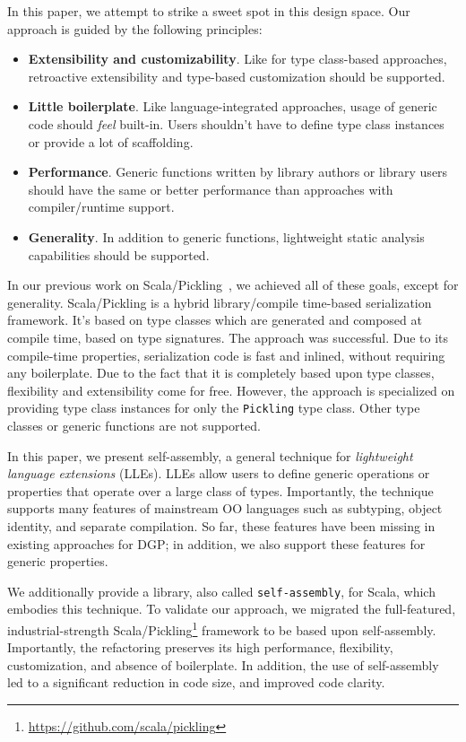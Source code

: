 \documentclass[preprint,nocopyrightspace]{sigplanconf}
\newcommand{\sselfassembly}{\texttt{self-assembly}}
\begin{document}
In this paper, we attempt to strike a sweet spot in this design space. Our
approach is guided by the following principles:

\begin{itemize}
\item\textbf{Extensibility and customizability}. Like for type class-based
     approaches, retroactive extensibility and type-based customization
     should be supported.

\item\textbf{Little boilerplate}. Like language-integrated approaches, usage
     of generic code should \emph{feel} built-in. Users shouldn't have to define
     type class instances or provide a lot of scaffolding.

\item\textbf{Performance}. Generic functions written by library authors or library
     users should have the same or better performance than approaches with
     compiler/runtime support.

\item\textbf{Generality}. In addition to generic functions, lightweight static
     analysis capabilities should be supported.
\end{itemize}

In our previous work on Scala/Pickling~\cite{Pickling}, we achieved all of these goals, except for
generality. Scala/Pickling is a hybrid library/compile time-based
serialization framework. It's based on type classes which are generated and
composed at compile time, based on type signatures. The approach was
successful. Due to its compile-time properties, serialization code is fast and
inlined, without requiring any boilerplate. Due to the fact that it is
completely based upon type classes, flexibility and extensibility come for
free. However, the approach is specialized on providing type class instances
for only the \verb|Pickling| type class. Other type classes or generic
functions are not supported.

In this paper, we present self-assembly, a general technique for
\emph{lightweight language extensions} (LLEs). LLEs allow users to define
generic operations or properties that operate over a large class of types.
Importantly, the technique supports many features of mainstream OO languages
such as subtyping, object identity, and separate compilation. So far, these
features have been missing in existing approaches for DGP; in addition, we
also support these features for generic properties.

We additionally provide a library, also called \sselfassembly, for Scala, which
embodies this technique. To validate our approach, we migrated the full-featured,
industrial-strength Scala/Pickling\footnote{\url{https://github.com/scala/pickling}} framework to be based
upon self-assembly. Importantly, the refactoring preserves its high
performance, flexibility, customization, and absence of boilerplate. In
addition, the use of self-assembly led to a significant reduction in code
size, and improved code clarity.
\end{document}
